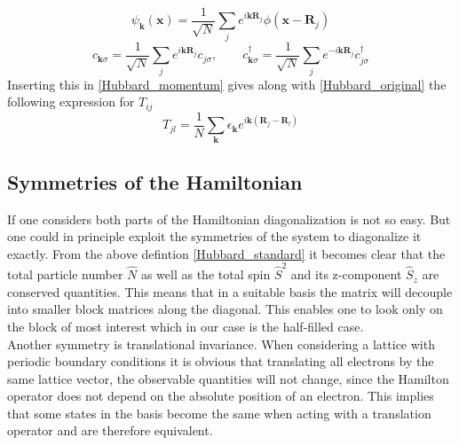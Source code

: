 \begin{equation}\label{Wannier}
\psi_{\boldsymbol{k}} \left( \boldsymbol{x}\right) = \frac{1}{\sqrt{N}}\sum_{j} e^{i\boldsymbol{k}\boldsymbol{R}_j} \phi(\boldsymbol{x}-\boldsymbol{R}_j)
\end{equation} 
\begin{equation}\label{c_momentum}
c_{\boldsymbol{k}\sigma} = \frac{1}{\sqrt{N}}\sum_{j} e^{i\boldsymbol{k}\boldsymbol{R}_j} c_{j\sigma}, \qquad c_{\boldsymbol{k}\sigma}^\dagger = \frac{1}{\sqrt{N}}\sum_{j} e^{-i\boldsymbol{k}\boldsymbol{R}_j} c_{j\sigma}^\dagger
\end{equation}  
Inserting this in \eqref{Hubbard_momentum} gives along with \eqref{Hubbard_original} the following expression for $ T_{ij} $ 
\begin{equation}\label{T}
T_{jl} = \frac{1}{N} \sum_{\boldsymbol{k}}\epsilon_{\boldsymbol{k}} e^{i\boldsymbol{k}\left( \boldsymbol{R}_j - \boldsymbol{R}_l\right) }
\end{equation}

\subsection{Symmetries of the Hamiltonian}
If one considers both parts of the Hamiltonian diagonalization is not so easy. But one could in principle exploit the symmetries of the system to diagonalize it exactly. From the above defintion \eqref{Hubbard_standard} it becomes clear that the total particle number $ \hat{N} $ as well as the total spin $ \hat{S}^2 $ and its z-component $ \hat{S}_z $ are conserved quantities. This means that in a suitable basis the matrix will decouple into smaller block matrices along the diagonal. This enables one to look only on the block of most interest which in our case is the half-filled case. \\


Another symmetry is translational invariance. When considering a lattice with periodic boundary conditions it is obvious that translating all electrons by the same lattice vector, the observable quantities will not change, since the Hamilton operator does not depend on the absolute position of an electron. This implies that some states in the basis become the same when acting with a translation operator and are therefore equivalent.\\

